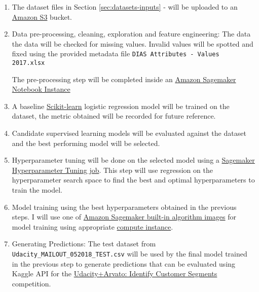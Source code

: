 \documentclass[a4paper]{article}
\begin{document}
\begin{enumerate}
\item The dataset files in Section \ref{sec:datasets-inputs} -  will be uploaded to an \href{https://aws.amazon.com/s3/}{Amazon S3} bucket.
\item Data pre-processing, cleaning, exploration and feature engineering: The data the data will be checked for missing values. Invalid values will be spotted and fixed using the provided metadata file \texttt{DIAS Attributes - Values 2017.xlsx}

  The pre-processing step will be completed inside an \href{https://docs.aws.amazon.com/sagemaker/latest/dg/nbi.html}{Amazon Sagemaker Notebook Instance}
\item A baseline \href{https://scikit-learn.org/stable/}{Scikit-learn} logistic regression model will be trained on the dataset, the metric obtained will be recorded for future reference.
\item Candidate supervised learning models will be evaluated against the dataset and the best performing model will be selected.
\item Hyperparameter tuning will be done on the selected model using a \href{https://docs.aws.amazon.com/sagemaker/latest/dg/automatic-model-tuning.html}{Sagemaker Hyperparameter Tuning job}. This step will use regression on the hyperparameter search space to find the best and optimal hyperparameters to train the model.
\item Model training using the best hyperparameters obtained in the previous steps. I will use one of \href{https://docs.aws.amazon.com/sagemaker/latest/dg/algos.html}{Amazon Sagemaker built-in algorithm images} for model training using appropriate \href{https://aws.amazon.com/ec2/instance-types/}{compute instance}.
\item Generating Predictions: The test dataset from \texttt{Udacity\_MAILOUT\_052018\_TEST.csv} will be used by the final model trained in the previous step to generate predictions that can be evaluated using  Kaggle API for the \href{https://www.kaggle.com/c/udacity-arvato-identify-customers/data}{Udacity+Arvato: Identify Customer Segments} competition.
\end{enumerate}


\newpage
\printbibliography[heading=bibintoc]
\end{document}
